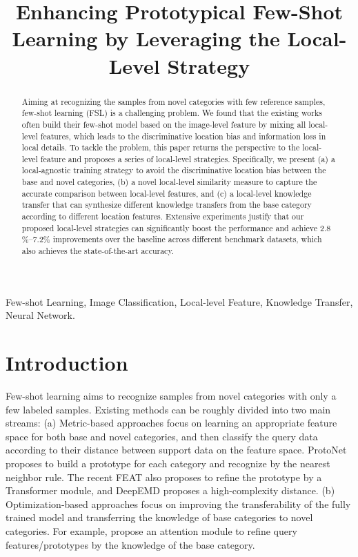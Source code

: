 \documentclass{article}
\title{Enhancing Prototypical Few-Shot Learning by Leveraging the Local-Level Strategy}
\begin{document}
\maketitle
\begin{abstract}
Aiming at recognizing the samples from novel categories with few reference samples, few-shot learning (FSL) is a challenging problem. We found that the existing works often build their few-shot model based on the image-level feature by mixing all local-level features, which leads to the discriminative location bias and information loss in local details. To tackle the problem, this paper returns the perspective to the local-level feature and proposes a series of local-level strategies. Specifically, we present (a) a local-agnostic training strategy to avoid the discriminative location bias between the base and novel categories, (b) a novel local-level similarity measure to capture the accurate comparison between local-level features, and (c) a local-level knowledge transfer that can synthesize different knowledge transfers from the base category according to different location features. Extensive experiments justify that our proposed local-level strategies can significantly boost the performance and achieve 2.8$\%$–7.2$\%$ improvements over the baseline across different benchmark datasets, which also achieves the state-of-the-art accuracy.
\end{abstract}
\begin{keywords}
Few-shot Learning, Image Classification, Local-level Feature, Knowledge Transfer, Neural Network.
\end{keywords}
\section{Introduction}
\label{sec:intro}
Few-shot learning aims to recognize samples from novel categories with only a few labeled samples. Existing methods can be roughly divided into two main streams: (a) Metric-based approaches \cite{hou2019cross, kye2020transductive, snell2017prototypical, vinyals2016matching, zhang2020deepemd,wang2019simpleshot, multi-pro} focus on learning an appropriate feature space for both base and novel categories, and then classify the query data according to their distance between support data on the feature space. ProtoNet \cite{snell2017prototypical} proposes to build a prototype for each category and recognize by the nearest neighbor rule. The recent FEAT \cite{ye2020set} also proposes to refine the prototype by a Transformer module, and DeepEMD proposes a high-complexity distance. (b) Optimization-based approaches \cite{finn2017model, hu2020empirical, lee2019meta, gidaris2018dynamic, liu2019large} focus on improving the transferability of the fully trained model and transferring the knowledge of base categories to novel categories. For example, \cite{gidaris2018dynamic, liu2019large} propose an attention module to refine query features/prototypes by the knowledge of the base category.
\end{document}
